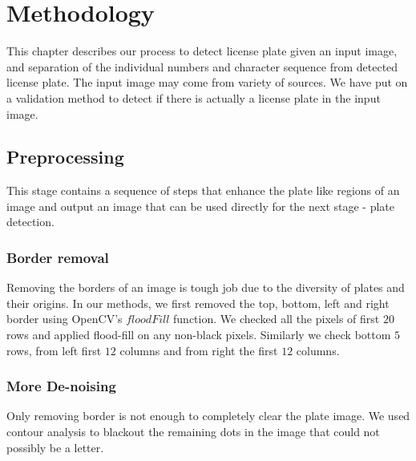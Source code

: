 \documentclass{standalone}
\begin{document}
\chapter{Methodology}
This chapter describes our process to detect license plate given an input image, and separation of the individual numbers and character sequence from detected license plate. The input image may come from variety of sources. We have put on a validation method to detect if there is actually a license plate in the input image.

  
  

\section{Preprocessing}
This stage contains a sequence of steps that enhance the plate like regions of an image and output an image that can be used directly for the next stage - plate detection.

  
  
  
  
  
  
  


  
  
  
  
  
  
  



\subsection{Border removal}
Removing the borders of an image is tough job due to the diversity of plates and their origins. In our methods, we first removed the top, bottom, left and right border using OpenCV's $floodFill$ function. We checked all the pixels of first $20$ rows and applied flood-fill on any non-black pixels. Similarly we check bottom $5$ rows, from left first $12$ columns and from right the first $12$ columns.

\subsection{More De-noising}
Only removing border is not enough to completely clear the plate image. We used contour analysis to blackout the remaining dots in the image that could not possibly be a letter. 
\end{document}
